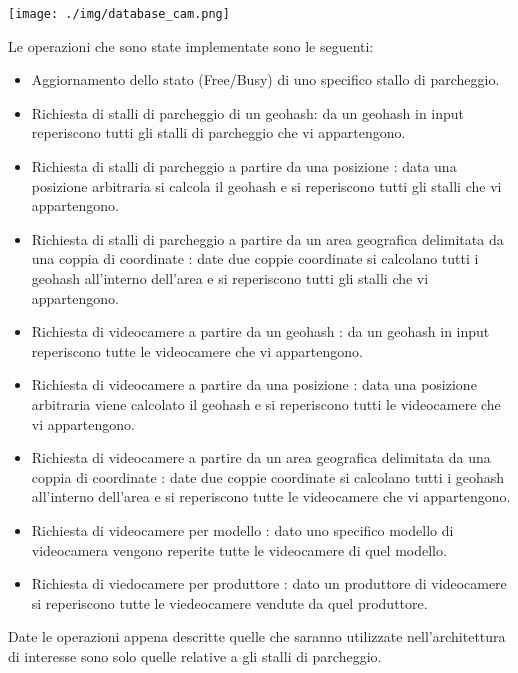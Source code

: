 \vspace{1.6truecm}

\centerline{\texttt{[image: ./img/database\_cam.png]}}

\vspace{1.2truecm}

Le operazioni che sono state implementate sono le seguenti:


\begin{itemize}
	\item Aggiornamento dello stato (Free/Busy) di uno specifico stallo di parcheggio.
	\item Richiesta di stalli di parcheggio di un geohash: da un geohash in input reperiscono tutti gli stalli di parcheggio che vi appartengono.
	\item Richiesta di stalli di parcheggio a partire da una posizione : data una posizione arbitraria si calcola il geohash e si reperiscono tutti gli stalli che vi appartengono.
	\item Richiesta di stalli di parcheggio a partire da un area geografica delimitata da una coppia di coordinate : date due coppie coordinate si calcolano tutti i geohash all'interno dell'area e si reperiscono tutti gli stalli che vi appartengono.
	\item Richiesta di videocamere a partire da un geohash : da un geohash in input reperiscono tutte le videocamere che vi appartengono.
	\item Richiesta di videocamere a partire da una posizione : data una posizione arbitraria viene calcolato il geohash e si reperiscono tutti le videocamere che vi appartengono.
	\item Richiesta di videocamere a partire da un area geografica delimitata da una coppia di coordinate : date due coppie coordinate si calcolano tutti i geohash all'interno dell'area e si reperiscono tutte le videocamere che vi appartengono.
	\item Richiesta di videocamere per modello : dato uno specifico modello di videocamera vengono reperite tutte le videocamere di quel modello.
	\item Richiesta di viedocamere per produttore : dato un produttore di videocamere si reperiscono tutte le viedeocamere vendute da quel produttore.
\end{itemize}

Date le operazioni appena descritte quelle che saranno utilizzate nell'architettura di interesse sono solo quelle relative a gli stalli di parcheggio.
\vspace{0.5truecm}


